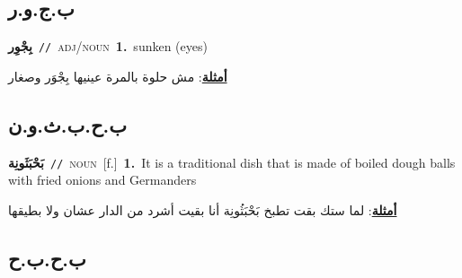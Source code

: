 \documentclass[10pt,a4paper,twoside]{article} %
\begin{document}
\begin{multicols}{2}
{{{{\vspace{-3mm}
\subsection*{\color{blue}\foreignlanguage{arabic}{ب.ج.و.ر}\color{blue}{ (ntws)}} 

{\setlength\topsep{0pt}\textbf{\foreignlanguage{arabic}{بِجْوِر}}\ {\color{gray}\texttt{//}\color{black}}\ \textsc{adj/noun}\ \textbf{1.}~sunken (eyes)\  \begin{flushright}\color{gray}\foreignlanguage{arabic}{\textbf{\underline{\foreignlanguage{arabic}{أمثلة}}}: مش حلوة بالمرة عينيها بِجْوَر وصغار}\end{flushright}\color{black}} \vspace{2mm}

\vspace{-3mm}
\subsection*{\color{blue}\foreignlanguage{arabic}{ب.ح.ب.ث.و.ن}\color{blue}{ (ntws)}} 

{\setlength\topsep{0pt}\textbf{\foreignlanguage{arabic}{بَحْبَثَونِة}}\ {\color{gray}\texttt{//}\color{black}}\ \textsc{noun}\ [f.]\ \textbf{1.}~It is a traditional dish that is made of boiled dough balls with fried onions and Germanders\  \begin{flushright}\color{gray}\foreignlanguage{arabic}{\textbf{\underline{\foreignlanguage{arabic}{أمثلة}}}: لما ستك بقت تطبخ بَحْبَثُونِة أنا بقيت أشرد من الدار عشان ولا بطيقها}\end{flushright}\color{black}} \vspace{2mm}

\vspace{-3mm}
\subsection*{\color{blue}\foreignlanguage{arabic}{ب.ح.ب.ح}\color{blue}{}} 

}}}}
\end{multicols}
\end{document}
